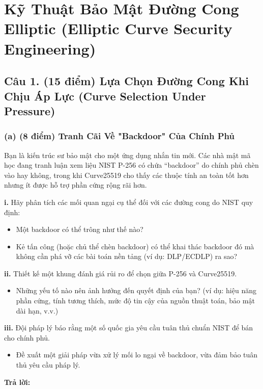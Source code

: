 \section{Kỹ Thuật Bảo Mật Đường Cong Elliptic (Elliptic Curve Security Engineering)}

\subsection{Câu 1. (15 điểm) Lựa Chọn Đường Cong Khi Chịu Áp Lực (Curve Selection Under Pressure)}

\subsubsection{(a) (8 điểm) Tranh Cãi Về "Backdoor" Của Chính Phủ}

Bạn là kiến trúc sư bảo mật cho một ứng dụng nhắn tin mới. Các nhà mật mã học đang tranh luận xem liệu NIST P-256 có chứa ``backdoor'' do chính phủ chèn vào hay không, trong khi Curve25519 cho thấy các thuộc tính an toàn tốt hơn nhưng ít được hỗ trợ phần cứng rộng rãi hơn.

\textbf{i.} Hãy phân tích các mối quan ngại cụ thể đối với các đường cong do NIST quy định:
\begin{itemize}
    \item Một backdoor có thể trông như thế nào?
    \item Kẻ tấn công (hoặc chủ thể chèn backdoor) có thể khai thác backdoor đó mà không cần phá vỡ các bài toán nền tảng (ví dụ: DLP/ECDLP) ra sao?
\end{itemize}

\textbf{ii.} Thiết kế một khung đánh giá rủi ro để chọn giữa P-256 và Curve25519.
\begin{itemize}
    \item Những yếu tố nào nên ảnh hưởng đến quyết định của bạn? (ví dụ: hiệu năng phần cứng, tính tương thích, mức độ tin cậy của nguồn thuật toán, bảo mật dài hạn, v.v.)
\end{itemize}

\textbf{iii.} Đội pháp lý báo rằng một số quốc gia yêu cầu tuân thủ chuẩn NIST để bán cho chính phủ.
\begin{itemize}
    \item Đề xuất một giải pháp vừa xử lý mối lo ngại về backdoor, vừa đảm bảo tuân thủ yêu cầu pháp lý.
\end{itemize}

\begin{center}
    \textbf{Trả lời:}
\end{center}

